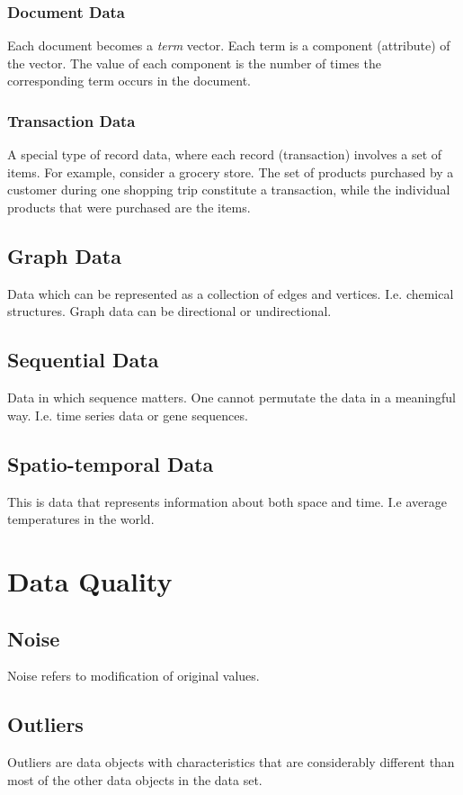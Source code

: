\subsubsection{Document Data}
Each document becomes a \textit{term} vector.
Each term is a component (attribute) of the vector.
The value of each component is the number of times the corresponding term occurs in the document.

\subsubsection{Transaction Data}
A special type of record data, where each record (transaction) involves a set of items.
For example, consider a grocery store. The set of products purchased by a customer during one shopping trip constitute a transaction, while the individual products that were purchased are the items.

\subsection{Graph Data}
Data which can be represented as a collection of edges and vertices. 
I.e. chemical structures. Graph data can be directional or undirectional. 

\subsection{Sequential Data}
Data in which sequence matters. One cannot permutate the data in a meaningful
way. I.e. time series data or gene sequences.

\subsection{Spatio-temporal Data}
This is data that represents information about both space and time. 
I.e average temperatures in the world. 

\section{Data Quality}

\subsection{Noise}
Noise refers to modification of original values.

\subsection{Outliers}
Outliers are data objects with characteristics that are considerably different than most of the other data objects in the data set.

